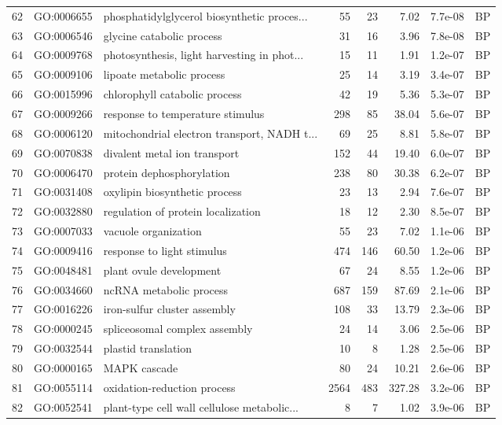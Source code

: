 \documentclass[12pt,oneside,a4paper]{article}
\begin{document}
\begin{longtable}{rllrrrll}
  62 & GO:0006655 & phosphatidylglycerol biosynthetic proces... &  55 &  23 & 7.02 & 7.7e-08 & BP \\ 
  63 & GO:0006546 & glycine catabolic process &  31 &  16 & 3.96 & 7.8e-08 & BP \\ 
  64 & GO:0009768 & photosynthesis, light harvesting in phot... &  15 &  11 & 1.91 & 1.2e-07 & BP \\ 
  65 & GO:0009106 & lipoate metabolic process &  25 &  14 & 3.19 & 3.4e-07 & BP \\ 
  66 & GO:0015996 & chlorophyll catabolic process &  42 &  19 & 5.36 & 5.3e-07 & BP \\ 
  67 & GO:0009266 & response to temperature stimulus & 298 &  85 & 38.04 & 5.6e-07 & BP \\ 
  68 & GO:0006120 & mitochondrial electron transport, NADH t... &  69 &  25 & 8.81 & 5.8e-07 & BP \\ 
  69 & GO:0070838 & divalent metal ion transport & 152 &  44 & 19.40 & 6.0e-07 & BP \\ 
  70 & GO:0006470 & protein dephosphorylation & 238 &  80 & 30.38 & 6.2e-07 & BP \\ 
  71 & GO:0031408 & oxylipin biosynthetic process &  23 &  13 & 2.94 & 7.6e-07 & BP \\ 
  72 & GO:0032880 & regulation of protein localization &  18 &  12 & 2.30 & 8.5e-07 & BP \\ 
  73 & GO:0007033 & vacuole organization &  55 &  23 & 7.02 & 1.1e-06 & BP \\ 
  74 & GO:0009416 & response to light stimulus & 474 & 146 & 60.50 & 1.2e-06 & BP \\ 
  75 & GO:0048481 & plant ovule development &  67 &  24 & 8.55 & 1.2e-06 & BP \\ 
  76 & GO:0034660 & ncRNA metabolic process & 687 & 159 & 87.69 & 2.1e-06 & BP \\ 
  77 & GO:0016226 & iron-sulfur cluster assembly & 108 &  33 & 13.79 & 2.3e-06 & BP \\ 
  78 & GO:0000245 & spliceosomal complex assembly &  24 &  14 & 3.06 & 2.5e-06 & BP \\ 
  79 & GO:0032544 & plastid translation &  10 &   8 & 1.28 & 2.5e-06 & BP \\ 
  80 & GO:0000165 & MAPK cascade &  80 &  24 & 10.21 & 2.6e-06 & BP \\ 
  81 & GO:0055114 & oxidation-reduction process & 2564 & 483 & 327.28 & 3.2e-06 & BP \\ 
  82 & GO:0052541 & plant-type cell wall cellulose metabolic... &   8 &   7 & 1.02 & 3.9e-06 & BP \\ 

\end{longtable}
\end{document}
